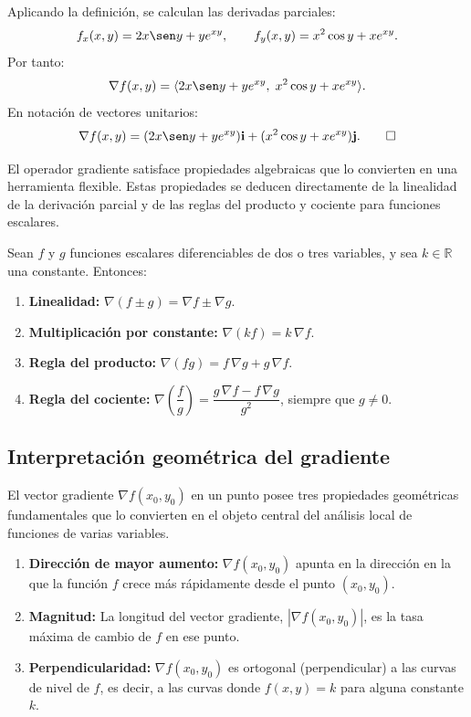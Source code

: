\begin{myproof}
Aplicando la definición, se calculan las derivadas parciales:
\[
f_x(x,y) = 2x \sen y + y e^{xy}, \qquad
f_y(x,y) = x^2 \cos y + x e^{xy}.
\]
Por tanto:
\[
\nabla f(x,y) = \langle 2x \sen y + y e^{xy},\; x^2 \cos y + x e^{xy} \rangle.
\]
En notación de vectores unitarios:
\[
\nabla f(x,y) = (2x \sen y + y e^{xy})\mathbf{i}
              + (x^2 \cos y + x e^{xy})\mathbf{j}. \qquad\square
\]
\end{myproof}

El operador gradiente satisface propiedades algebraicas que lo convierten
en una herramienta flexible. Estas propiedades se deducen directamente de
la linealidad de la derivación parcial y de las reglas del producto y
cociente para funciones escalares.

\begin{theorem}
Sean $f$ y $g$ funciones escalares diferenciables de dos o tres
variables, y sea $k\in\mathbb{R}$ una constante. Entonces:
\begin{enumerate}
    \item \textbf{Linealidad:}
    $\nabla(f \pm g) = \nabla f \pm \nabla g$.
    \item \textbf{Multiplicación por constante:}
    $\nabla(kf) = k\,\nabla f$.
    \item \textbf{Regla del producto:}
    $\nabla(fg) = f\,\nabla g + g\,\nabla f$.
    \item \textbf{Regla del cociente:}
    $\nabla\left(\dfrac{f}{g}\right) =
    \dfrac{g\,\nabla f - f\,\nabla g}{g^2}$, siempre que $g\neq 0$.
\end{enumerate}
\end{theorem}

\subsection{Interpretación geométrica del gradiente}

El vector gradiente $\nabla f(x_0,y_0)$ en un punto posee tres
propiedades geométricas fundamentales que lo convierten en el objeto
central del análisis local de funciones de varias variables.

\begin{enumerate}
    \item \textbf{Dirección de mayor aumento:} $\nabla f(x_0,y_0)$
    apunta en la dirección en la que la función $f$ crece más
    rápidamente desde el punto $(x_0,y_0)$.
    \item \textbf{Magnitud:} La longitud del vector gradiente,
    $|\nabla f(x_0,y_0)|$, es la tasa máxima de cambio de $f$ en ese
    punto.
    \item \textbf{Perpendicularidad:} $\nabla f(x_0,y_0)$ es ortogonal
    (perpendicular) a las curvas de nivel de $f$, es decir, a las curvas
    donde $f(x,y) = k$ para alguna constante $k$.
\end{enumerate}

